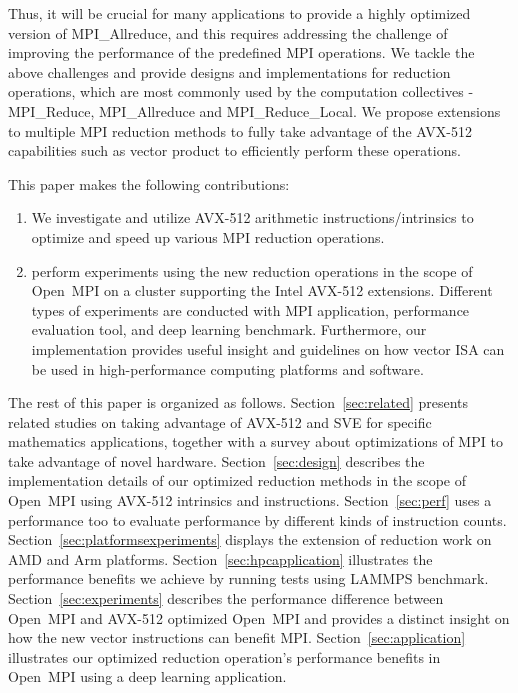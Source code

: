 \documentclass[5p,times,twocolumn]{elsarticle}
\newcommand{\ompi}[0]{Open~MPI\xspace}
\newcommand{\mpi}[0]{\textsc{MPI}\xspace}
\newcommand{\sve}[0]{\textsc{SVE}\xspace}
\begin{document}
Thus, it will be crucial for many applications to provide a highly optimized
version of MPI\_Allreduce, and this requires addressing the challenge of improving the performance of the predefined MPI operations. We tackle the above challenges and provide designs and implementations
for reduction operations, which are most commonly used by the computation
collectives - MPI\_Reduce, MPI\_Allreduce and MPI\_Reduce\_Local.
We propose extensions to multiple \mpi reduction methods to fully take
advantage of the AVX-512 capabilities such as vector product to efficiently
perform these operations.

This paper makes the following contributions:
\begin{enumerate}
  \item We investigate and utilize AVX-512 arithmetic instructions/intrinsics to optimize and
  speed up various \mpi reduction operations.
%
  \item perform experiments using the new reduction operations in the scope
  of \ompi on a cluster supporting the Intel AVX-512 extensions. Different types of
  experiments are conducted with \mpi application, performance evaluation tool, and
  deep learning benchmark.
  Furthermore, our implementation provides useful insight and guidelines on how vector
  ISA can be used in high-performance computing platforms and software.
\end{enumerate}

The rest of this paper is organized as follows.
Section~\ref{sec:related} presents related studies on taking advantage of AVX-512 and \sve for specific mathematics applications, together with a survey about optimizations of \mpi to take advantage of novel hardware.
Section~\ref{sec:design} describes the implementation details of our optimized reduction methods in the scope of \ompi using AVX-512 intrinsics and instructions.
Section~\ref{sec:perf} uses a performance too to evaluate performance by different kinds of instruction counts.
Section~\ref{sec:platformsexperiments} displays the extension of reduction work on AMD and Arm platforms.
Section~\ref{sec:hpcapplication} illustrates the performance benefits we achieve by running tests using LAMMPS benchmark.
Section~\ref{sec:experiments} describes the performance difference between
\ompi and AVX-512 optimized \ompi and provides a distinct insight on how the
new vector instructions can benefit \mpi.
Section~\ref{sec:application} illustrates our optimized reduction operation's performance
benefits in \ompi using a deep learning application.
\end{document}
